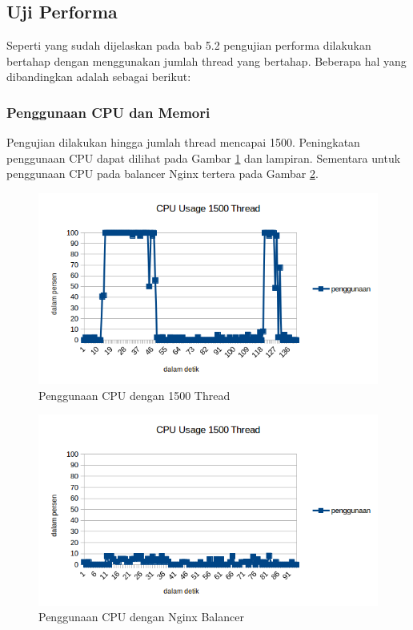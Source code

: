 \documentclass{ta-its}
\begin{document}
			
			\subsection{Uji Performa}
				Seperti yang sudah dijelaskan pada bab 5.2 pengujian performa dilakukan bertahap dengan menggunakan jumlah thread yang bertahap. Beberapa hal yang dibandingkan adalah sebagai berikut:
				
				\subsubsection{Penggunaan CPU dan Memori}
					Pengujian dilakukan hingga jumlah thread mencapai 1500. Peningkatan penggunaan CPU dapat dilihat pada Gambar \ref{gambarUsage1500} dan lampiran. Sementara untuk penggunaan CPU pada balancer Nginx tertera pada Gambar \ref{gambarUsageNginx}.
					
					\begin{figure}[h] %
						\centering
						\includegraphics[width=\linewidth]{contoh_img/usage/1500}
						\caption{Penggunaan CPU dengan 1500 Thread}
						\label{gambarUsage1500}
					\end{figure}
					
					\begin{figure}[h] %
						\centering
						\includegraphics[width=\linewidth]{contoh_img/usage/nginx}
						\caption{Penggunaan CPU dengan Nginx Balancer}
						\label{gambarUsageNginx}
					\end{figure}
					
\end{document}
